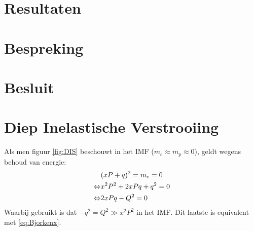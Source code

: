\documentclass[a4paper,11pt]{article}
\numberwithin{equation}{section} %
\begin{document}
\section{Resultaten}


\section{Bespreking}

\section{Besluit}

\newpage
\appendix
\section{Diep Inelastische Verstrooiing} \label{app:DIS}
Als men figuur \ref{fig:DIS} beschouwt in het IMF ($m_e \approx m_p \approx 0$), geldt wegens behoud van energie:
\begin{align}
&(xP+q)^2 = m_e = 0 \notag \\
\Leftrightarrow &x^2 P^2 + 2xPq + q^2 = 0 \notag \\
\Leftrightarrow &2xPq -Q^2=0
\end{align}
Waarbij gebruikt is dat $-q^2 = Q^2 \gg x^2P^2$ in het  IMF. Dit laatste is equivalent met \eqref{eq:Bjorkenx}.
\end{document}
